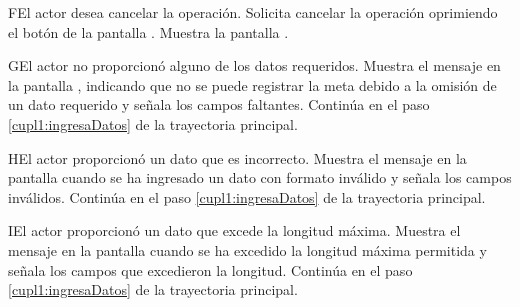 \begin{UCtrayectoriaA}{F}{El actor desea cancelar la operación.}
	\UCpaso[\UCactor] Solicita cancelar la operación oprimiendo el botón  de la pantalla .
	\UCpaso[\UCsist] Muestra la pantalla  .
\end{UCtrayectoriaA} 

\begin{UCtrayectoriaA}{G}{El actor no proporcionó alguno de los datos requeridos.}
	\UCpaso[\UCsist] Muestra el mensaje  en la pantalla  ,
	indicando que no se puede registrar la meta debido a la omisión de un dato requerido y señala los campos faltantes.
	\UCpaso[] Continúa en el paso \ref{cupl1:ingresaDatos} de la trayectoria principal.
\end{UCtrayectoriaA}

\begin{UCtrayectoriaA}{H}{El actor proporcionó un dato que es incorrecto.}
	\UCpaso[\UCsist] Muestra el mensaje  en la pantalla 
	cuando se ha ingresado un dato con formato inválido y señala los campos inválidos.
	\UCpaso[] Continúa en el paso \ref{cupl1:ingresaDatos} de la trayectoria principal.
\end{UCtrayectoriaA}
 
\begin{UCtrayectoriaA}{I}{El actor proporcionó un dato que excede la longitud máxima.}
	\UCpaso[\UCsist] Muestra el mensaje  en la pantalla 
	cuando se ha excedido la longitud máxima permitida y señala los campos que excedieron la longitud.
	\UCpaso[] Continúa en el paso \ref{cupl1:ingresaDatos} de la trayectoria principal.
\end{UCtrayectoriaA}

